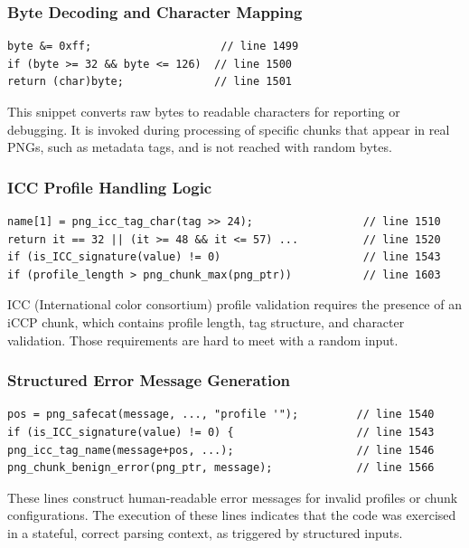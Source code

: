 \documentclass[11pt]{article}
\begin{document}
    \subsubsection{Byte Decoding and Character Mapping}
    \begin{lstlisting}
byte &= 0xff;                    // line 1499
if (byte >= 32 && byte <= 126)  // line 1500
return (char)byte;              // line 1501
    \end{lstlisting}

    This snippet converts raw bytes to readable characters for reporting or debugging. It is invoked during processing of specific chunks that appear in real PNGs, such as metadata tags, and is not reached with random bytes.

    \subsubsection{ICC Profile Handling Logic}
    \begin{lstlisting}
name[1] = png_icc_tag_char(tag >> 24);                 // line 1510
return it == 32 || (it >= 48 && it <= 57) ...          // line 1520
if (is_ICC_signature(value) != 0)                      // line 1543
if (profile_length > png_chunk_max(png_ptr))           // line 1603
    \end{lstlisting}

    ICC (International color consortium) profile validation requires the presence of an iCCP chunk, which contains profile length, tag structure, and character validation. Those requirements are hard to meet with a random input.

    \subsubsection{Structured Error Message Generation}
    \begin{lstlisting}
pos = png_safecat(message, ..., "profile '");         // line 1540
if (is_ICC_signature(value) != 0) {                   // line 1543
png_icc_tag_name(message+pos, ...);                   // line 1546
png_chunk_benign_error(png_ptr, message);             // line 1566
    \end{lstlisting}

    These lines construct human-readable error messages for invalid profiles or chunk configurations. The execution of these lines indicates that the code was exercised in a stateful, correct parsing context, as triggered by structured inputs. \\ \\
\end{document}
